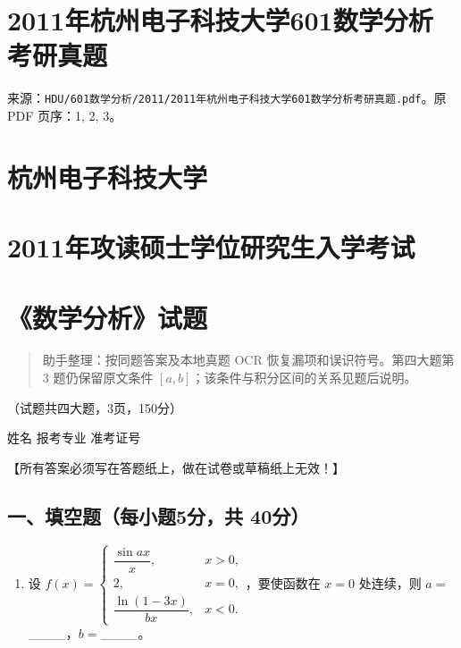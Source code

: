 \documentclass[11pt,fontset=fandol]{ctexart}
\providecommand{\tightlist}{\setlength{\itemsep}{0pt}\setlength{\parskip}{0pt}}
\begin{document}
\section{2011年杭州电子科技大学601数学分析考研真题}\label{ux5e74ux676dux5ddeux7535ux5b50ux79d1ux6280ux5927ux5b66601ux6570ux5b66ux5206ux6790ux8003ux7814ux771fux9898}

来源：\texttt{HDU/601数学分析/2011/2011年杭州电子科技大学601数学分析考研真题.pdf}。原
PDF 页序：1, 2, 3。

\section{杭州电子科技大学}\label{ux676dux5ddeux7535ux5b50ux79d1ux6280ux5927ux5b66}

\section{2011年攻读硕士学位研究生入学考试}\label{ux5e74ux653bux8bfbux7855ux58ebux5b66ux4f4dux7814ux7a76ux751fux5165ux5b66ux8003ux8bd5}

\section{《数学分析》试题}\label{ux6570ux5b66ux5206ux6790ux8bd5ux9898}

\begin{quote}
助手整理：按同题答案及本地真题 OCR 恢复漏项和误识符号。第四大题第 3
题仍保留原文条件 \([a,b]\)；该条件与积分区间的关系见题后说明。
\end{quote}

（试题共四大题，3页，150分）

姓名 报考专业 准考证号

【所有答案必须写在答题纸上，做在试卷或草稿纸上无效！】

\subsection{一、填空题（每小题5分，共
40分）}\label{ux4e00ux586bux7a7aux9898ux6bcfux5c0fux98985ux5206ux5171-40ux5206}

\begin{enumerate}
\def\labelenumi{\arabic{enumi}.}
\tightlist
\item
  设
  \(f(x)=\begin{cases}\dfrac{\sin ax}{x},&x>0,\\2,&x=0,\\\dfrac{\ln(1-3x)}{bx},&x<0.\end{cases}\)，要使函数在
  \(x=0\) 处连续，则 \(a=\)\_\_\_\_，\(b=\)\_\_\_\_。
\end{enumerate}
\end{document}
